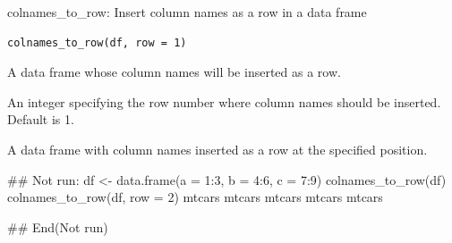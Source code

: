 \documentclass[a4paper]{book}
\begin{document}
%
\begin{Description}
colnames\_to\_row: Insert column names as a row in a data frame
\end{Description}
%
\begin{Usage}
\begin{verbatim}
colnames_to_row(df, row = 1)
\end{verbatim}
\end{Usage}
%
\begin{Arguments}
\begin{ldescription}
\item[\code{df}] A data frame whose column names will be inserted as a row.

\item[\code{row}] An integer specifying the row number where column names should be inserted. Default is 1.
\end{ldescription}
\end{Arguments}
%
\begin{Value}
A data frame with column names inserted as a row at the specified position.
\end{Value}
%
\begin{Examples}
\begin{ExampleCode}
\#\# Not run: 
df <- data.frame(a = 1:3, b = 4:6, c = 7:9)
colnames_to_row(df)
colnames_to_row(df, row = 2)
mtcars
mtcars %
mtcars %
mtcars %
mtcars %

## End(Not run)
\end{ExampleCode}
\end{Examples}
\end{document}
